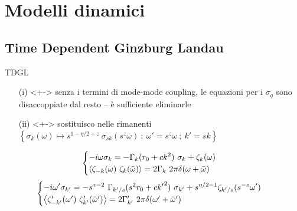 \documentclass[10pt]{beamer}
\begin{document}
\section{Modelli dinamici}
\subsection{Time Dependent Ginzburg Landau}
\begin{frame}{TDGL}
 \transwipe[direction=270]
 \begin{itemize}
  \item[(i)]<+-> senza i termini di mode-mode coupling, le equazioni per i $\sigma_q$ sono disaccoppiate dal resto -- è sufficiente eliminarle
  \item[(ii)]<+-> sostituisco nelle rimanenti $ \left \{\sigma_k(\omega) \mapsto s^{1-\eta/2 + z}\ \sigma_{sk}(s^z\omega)\ ; \ \omega' = s^{z} \omega\ ;\ k' = sk \right\} $
 \end{itemize}
{
\begin{equation*}
  \begin{cases}
   \displaystyle -i\omega \sigma_k = -\Gamma_k(r_0 + ck^2)  \ \sigma_k + \zeta_k(\omega)\\
   \left \langle \zeta_{-k}(\omega)\ \zeta_k(\bar\omega) \right \rangle = 2\Gamma_k\ 2\pi \delta(\omega + \bar\omega)\\
   \end{cases}
\end{equation*}
}
{
\begin{equation*}
 \begin{cases}
    \displaystyle -i\omega' \sigma_{k'} = -s^{z-2}\ \Gamma_{k'/s}(s^2 r_0 + c{k'}^2)  \ \sigma_{k'} + s^{\eta/2 -1}\zeta_{k'/s}(s^{-z}\omega') \\
    \left \langle \zeta'_{-k'}(\omega')\ \zeta'_{k'}(\bar\omega') \right \rangle = 2 \Gamma'_{k'}\ 2\pi \delta(\omega' + \bar\omega')
   \end{cases} 
\end{equation*}
}
\end{frame}
\end{document}
